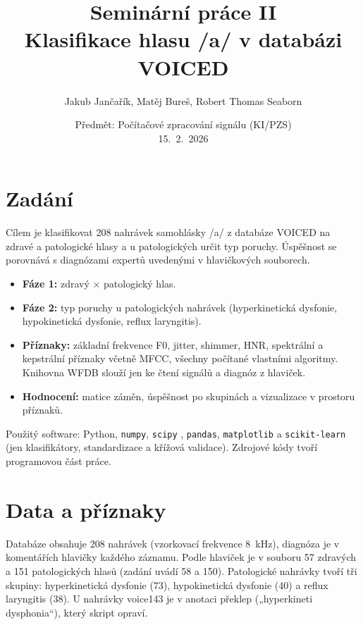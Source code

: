 \documentclass[11pt,a4paper]{article}
\title{\textbf{Seminární práce II}\\[2pt]
       Klasifikace hlasu /a/ v databázi VOICED}
\author{Jakub Jančařík, Matěj Bureš, Robert Thomas Seaborn}
\date{Předmět: Počítačové zpracování signálu (KI/PZS)\\[2pt] 15.~2.~2026}
\begin{document}
\maketitle

\section{Zadání}
Cílem je klasifikovat 208 nahrávek samohlásky /a/ z databáze VOICED \cite{voiced,physionet}
na zdravé a patologické hlasy a u patologických určit typ poruchy. Úspěšnost se porovnává
s diagnózami expertů uvedenými v hlavičkových souborech.

\begin{itemize}
  \item \textbf{Fáze 1:} zdravý $\times$ patologický hlas.
  \item \textbf{Fáze 2:} typ poruchy u patologických nahrávek (hyperkinetická dysfonie,
        hypokinetická dysfonie, reflux laryngitis).
  \item \textbf{Příznaky:} základní frekvence F0, jitter, shimmer, HNR, spektrální a kepstrální
        příznaky včetně MFCC, všechny počítané vlastními algoritmy. Knihovna WFDB slouží jen ke
        čtení signálů a diagnóz z hlaviček.
  \item \textbf{Hodnocení:} matice záměn, úspěšnost po skupinách a vizualizace v prostoru příznaků.
\end{itemize}

Použitý software: Python, \texttt{numpy}, \texttt{scipy} \cite{scipy}, \texttt{pandas},
\texttt{matplotlib} a \texttt{scikit-learn} \cite{sklearn} (jen klasifikátory, standardizace a
křížová validace). Zdrojové kódy tvoří programovou část práce.

\section{Data a příznaky}
Databáze obsahuje 208 nahrávek (vzorkovací frekvence 8~kHz), diagnóza je v komentářích hlavičky
každého záznamu. Podle hlaviček je v souboru 57 zdravých a 151 patologických hlasů (zadání uvádí
58 a 150). Patologické nahrávky tvoří tři skupiny: hyperkinetická dysfonie (73), hypokinetická
dysfonie (40) a reflux laryngitis (38). U nahrávky voice143 je v anotaci překlep
(„hyperkineti dysphonia“), který skript opraví.
\end{document}
